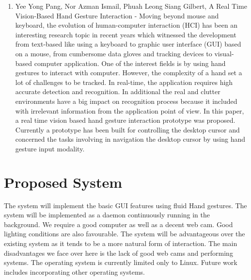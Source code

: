 \documentclass[11pt]{report}
\begin{document}
\begin{enumerate}
    \item Yee Yong Pang, Nor Azman Ismail, Phuah Leong Siang Gilbert, A Real Time Vision-Based Hand Gesture Interaction \cite{10} - Moving  beyond  mouse  and  keyboard,  the  evolution of human-computer interaction (HCI) has been an interesting research topic in recent years which witnessed the development from text-based  like  using  a  keyboard  to  graphic  user  interface (GUI)  based  on  a  mouse,  from  cumbersome  data  gloves  and tracking devices to visual-based computer application. One of the  interest  fields  is  by  using  hand  gestures  to  interact  with computer.  However,  the  complexity  of  a  hand  set  a  lot  of challenges to be tracked. In real-time, the application requires high accurate detection and recognition. In additional the real and  clutter  environments  have  a  big  impact  on  recognition process  because  it  included  with  irrelevant  information  from the   application   point   of   view.   In   this   paper,   a   real   time vision based hand gesture interaction prototype was proposed. Currently  a  prototype  has been built  for  controlling  the  desktop cursor  and  concerned  the  tasks  involving  in  navigation  the desktop  cursor  by  using  hand  gesture  input  modality.

\end{enumerate}

\section{Proposed System}


The system will implement the basic GUI features using fluid Hand gestures. The system will be implemented as a daemon continuously running in the background. We require a good computer as well as a decent web cam. Good lighting conditions are also favourable.
The system will be advantageous over the existing system as it tends to be a more natural form of interaction. 
The main disadvantages we face over here is the lack of good web cams and performing systems. The operating system is currently limited only to Linux. Future work includes incorporating other operating systems. 
\end{document}
